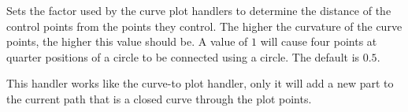 \begin{command}{\pgfsetplottension{}}
    Sets the factor used by the curve plot handlers to determine the distance
    of the control points from the points they control. The higher the
    curvature of the curve points, the higher this value should be. A value of
    $1$ will cause four points at quarter positions of a circle to be connected
    using a circle. The default is $0.5$.
\begin{codeexample}[]
\end{codeexample}
\end{command}

\begin{command}{\pgfplothandlerclosedcurve}
    This handler works like the curve-to plot handler, only it will add a new
    part to the current path that is a closed curve through the plot points.
\begin{codeexample}[]
\end{codeexample}
\end{command}


